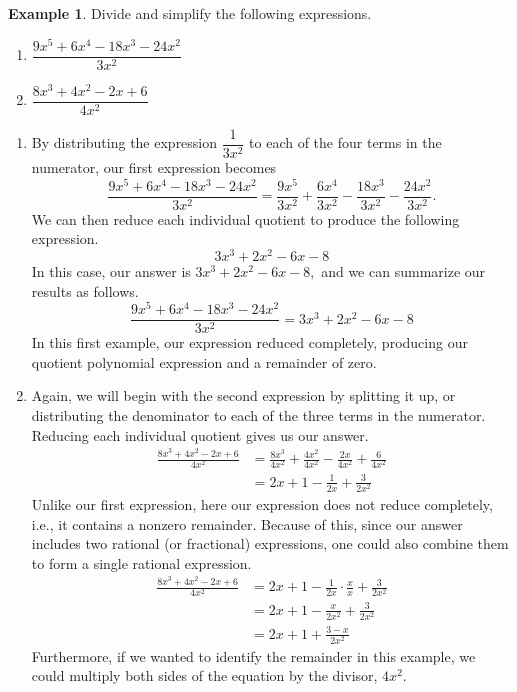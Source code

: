 \documentclass[12pt]{book}
\theoremstyle{definition}
\newtheorem{example}{Example}
\begin{document}
\begin{example}\label{poly_div_1} Divide and simplify the following expressions.
\begin{multicols}{2}
\begin{enumerate}
\item $\dfrac{9x^5+6x^4-18x^3-24x^2}{3x^2}$
\item $\dfrac{8x^3+4x^2-2x+6}{4x^2}$
\end{enumerate}
\end{multicols}
\begin{enumerate}
	\item By distributing the expression $\dfrac{1}{3x^2}$ to each of the four terms in the numerator, our first expression becomes
$$\frac{9x^5+6x^4-18x^3-24x^2}{3x^2}=\frac{9x^5}{3x^2}+\frac{6x^4}{3x^2}-\frac{18x^3}{3x^2}-\frac{24x^2}{3x^2}.$$
We can then reduce each individual quotient to produce the following expression.
$$3x^3+2x^2-6x-8$$
In this case, our answer is $3x^3+2x^2-6x-8,$ and we can summarize our results as follows.
$$\frac{9x^5+6x^4-18x^3-24x^2}{3x^2}=3x^3+2x^2-6x-8$$
In this first example, our expression reduced completely, producing our quotient polynomial expression and a remainder of zero.
	\item Again, we will begin with the second expression by splitting it up, or distributing the denominator to each of the three terms in the numerator.  Reducing each individual quotient gives us our answer. 
\begin{equation*}
\begin{split}
\frac{8x^3+4x^2-2x+6}{4x^2}&=\frac{8x^3}{4x^2}+\frac{4x^2}{4x^2}-\frac{2x}{4x^2}+\frac{6}{4x^2}\\
&=2x+1-\frac{1}{2x}+\frac{3}{2x^2}
\end{split}
\end{equation*}
Unlike our first expression, here our expression does not reduce completely, i.e., it contains a nonzero remainder.  Because of this, since our answer includes two rational (or fractional) expressions, one could also combine them to form a single rational expression.
\begin{equation*}
\begin{split}
\frac{8x^3+4x^2-2x+6}{4x^2}&=2x+1-\frac{1}{2x}\cdot\frac{x}{x}+\frac{3}{2x^2}\\
&=2x+1-\frac{x}{2x^2}+\frac{3}{2x^2}\\
&=2x+1+\frac{3-x}{2x^2}
\end{split}
\end{equation*}
Furthermore, if we wanted to identify the remainder in this example, we could multiply both sides of the equation by the divisor, $4x^2$.

\end{enumerate}
\end{example}
\end{document}
